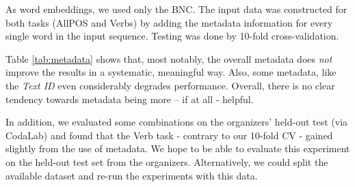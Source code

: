 \documentclass[11pt,a4paper]{article}
\begin{document}
As word embeddings, we used only the BNC.
The input data was constructed for both tasks (AllPOS and Verbs) by adding the metadata information for every single word in the input sequence. 
Testing was done by 10-fold cross-validation.

Table \ref{tab:metadata} shows that, most notably, the overall metadata does \emph{not} improve the results in a systematic, meaningful way.
Also, some metadata, like the \emph{Text ID} even considerably degrades performance. Overall, there is no clear tendency towards metadata being more -- if at all - helpful.  

In addition, we evaluated some combinations on the organizers' held-out test (via CodaLab) and found that the Verb task - contrary to our 10-fold CV - gained slightly from the use of metadata. We hope to be able to evaluate this experiment on the held-out test set from the organizers. Alternatively, we could split the available dataset and re-run the experiments with this data.
\end{document}
